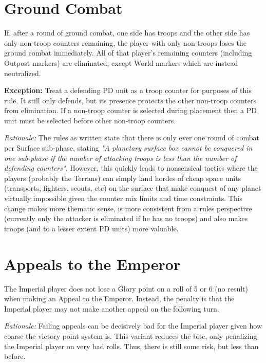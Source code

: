 \documentclass[a4paper,11pt]{article}
\begin{document}
\section{Ground Combat}

If, after a round of ground combat, one side has troops and the other side has only non-troop counters remaining, the player with only non-troops loses the ground combat immediately. All of that player's remaining counters (including Outpost markers) are eliminated, except World markers which are instead neutralized.

\textbf{Exception:} Treat a defending PD unit as a troop counter for purposes of this rule. It still only defends, but its presence protects the other non-troop counters from elimination. If a non-troop counter is selected during placement then a PD unit must be selected before other non-troop counters.

\textit{Rationale:} The rules as written state that there is only ever one round of combat per Surface sub-phase, stating \textit{"A planetary surface box cannot be conquered in one sub-phase if the number of attacking troops is less than the number of defending counters"}. However, this quickly leads to nonsensical tactics where the players (probably the Terrans) can simply land hordes of cheap space units (transports, fighters, scouts, etc) on the surface that make conquest of any planet virtually impossible given the counter mix limits and time constraints. This change makes more thematic sense, is more consistent from a rules perspective (currently only the attacker is eliminated if he has no troops) and also makes troops (and to a lesser extent PD units) more valuable.

\section{Appeals to the Emperor}

The Imperial player does not lose a Glory point on a roll of 5 or 6 (no result) when making an Appeal to the Emperor. Instead, the penalty is that the Imperial player may not make another appeal on the following turn.

\textit{Rationale:} Failing appeals can be decisively bad for the Imperial player given how coarse the victory point system is. This variant reduces the bite, only penalizing the Imperial player on very bad rolls. Thus, there is still some risk, but less than before.
\end{document}
